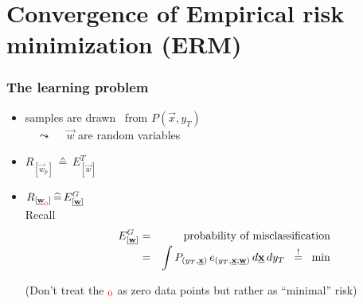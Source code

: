 \section{Convergence of Empirical risk minimization (ERM)}


\begin{frame}\frametitle{The learning problem}
	\begin{itemize}
		\item {\footnotesize samples are drawn \iid~from $P(\vec x, y_T)$\\[1mm]
			 $\quad \leadsto \quad$ $\vec w$ are random variables}
        \item $R_{[\vec w_p]}\,\corresponds\,E^{T}_{[\vec w]}$ 
        \item $R_{[\underline{\mathbf{w}}_{\color{red}0}]}\,\widehat{=}\,E^{G}_{[\underline{\mathbf{w}}]}$ \\
        Recall
        \begin{eqnarray} \hspace{5mm} 
			E_{[\underline{\mathbf{w}}]}^G 
			&=& \text{probability of misclassification} \\[-1mm]
			&=& \int P_{(y_T, \underline{\mathbf{x}})} \,
				e_{(y_T, \underline{\mathbf{x}};\underline{\mathbf{w}})} \, 
				d \underline{\mathbf{x}} \, d y_T \;\;\stackrel{\mathrm{!}}{=}\;\; \min
		\end{eqnarray}
        
        (Don't treat the ${\color{red}_0}$ as zero data points but rather as ``minimal'' risk)
	\end{itemize}
\end{frame}

